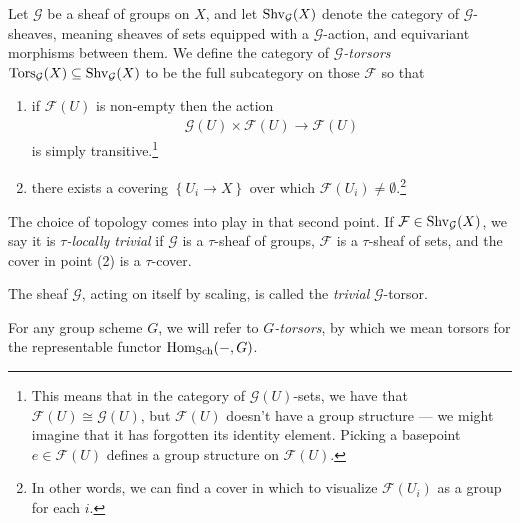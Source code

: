 \documentclass[11pt,openany]{book}
\begin{document}
\begin{definition}\label{def:torsor} 
\cite[03AH]{Stacks} Let $\mathcal{G}$ be a sheaf of groups on $X$, and let $\mathrm{Shv}_\mathcal{G}(X)$ denote the category of $\mathcal{G}$-sheaves, meaning sheaves of sets equipped with a $\mathcal{G}$-action, and equivariant morphisms between them. We define the category of $\mathcal{G}$\textit{-torsors} $\mathrm{Tors}_\mathcal{G}(X) \subseteq \mathrm{Shv}_\mathcal{G}(X)$ to be the full subcategory on those $\mathcal{F}$ so that
\begin{enumerate}
    \item if $\mathcal{F}(U)$ is non-empty then the action
    \begin{align*}
        \mathcal{G}(U) \times \mathcal{F}(U) \to \mathcal{F}(U)
    \end{align*}
    is simply transitive.\footnote{This means that in the category of $\mathcal{G}(U)$-sets, we have that $\mathcal{F}(U) \cong \mathcal{G}(U)$, but $\mathcal{F}(U)$ doesn't have a group structure --- we might imagine that it has forgotten its identity element. Picking a basepoint $e\in \mathcal{F}(U)$ defines a group structure on $\mathcal{F}(U)$.} 
    
    \item there exists a covering $\left\{ U_i \to X \right\}$ over which $\mathcal{F}(U_i) \ne \emptyset$.\footnote{In other words, we can find a cover in which to visualize $\mathcal{F}(U_i)$ as a group for each $i$.}
\end{enumerate}
\end{definition}

\begin{terminology} The choice of topology comes into play in that second point. If $\mathcal{F} \in \mathrm{Shv}_{\mathcal{G}}(X)$, we say it is $\tau$\textit{-locally trivial} if $\mathcal{G}$ is a $\tau$-sheaf of groups, $\mathcal{F}$ is a $\tau$-sheaf of sets, and the cover in point (2) is a $\tau$-cover.
\end{terminology}


\begin{example} The sheaf $\mathcal{G}$, acting on itself by scaling, is called the \textit{trivial} $\mathcal{G}$-torsor.
\end{example}

\begin{example} For any group scheme $G$, we will refer to $G$\textit{-torsors}, by which we mean torsors for the representable functor $\mathrm{Hom}_{\mathrm{Sch}}(-,G)$.
\end{example}
\end{document}
